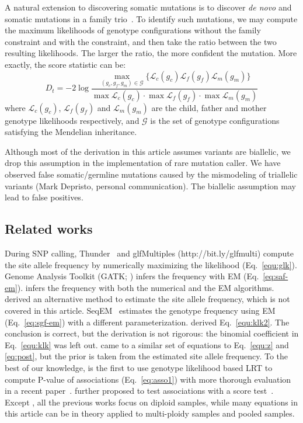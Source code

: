\documentclass{bioinfo}
\begin{document}
\begin{methods}
A natural extension to discovering somatic mutations is to discover {\it de
novo} and somatic mutations in a family trio~\citep{Conrad:2011kx}.  To
identify such mutations, we may compute the maximum likelihoods of genotype
configurations without the family constraint and with the constraint, and then
take the ratio between the two resulting likelihoods. The larger the ratio, the
more confident the mutation. More exactly, the score statistic can be:
\begin{equation}\label{eq:dt}
D_t=-2\log\frac
{\max_{(g_c,g_f,g_m)\in\mathcal{G}}\{\mathcal{L}_c(g_c)\mathcal{L}_f(g_f)\mathcal{L}_m(g_m)\}}
{\max\mathcal{L}_c(g_c)\cdot\max\mathcal{L}_f(g_f)\cdot\max\mathcal{L}_m(g_m)}
\end{equation}
where $\mathcal{L}_c(g_c)$, $\mathcal{L}_f(g_f)$ and $\mathcal{L}_m(g_m)$
are the child, father and mother genotype likelihoods respectively, and
$\mathcal{G}$ is the set of genotype configurations satisfying the Mendelian
inheritance.

Although most of the derivation in this article assumes variants are biallelic,
we drop this assumption in the implementation of rare mutation caller.  We have
observed false somatic/germline mutations caused by the mismodeling of
triallelic variants (Mark Depristo, personal communication). The biallelic
assumption may lead to false positives.

\subsection{Related works}
During SNP calling, Thunder~\citep{Li:2011fk} and glfMultiples
(http://bit.ly/glfmulti) compute the site allele frequency by numerically
maximizing the likelihood (Eq.~\ref{equ:glk}). Genome Analysis Toolkit (GATK;
\citealp{Depristo:2011vn}) infers the frequency with EM (Eq.~\ref{eq:saf-em}).
\citet{Kim:2011fk} infers the frequency with both the numerical and the EM
algorithms.  \citet{Li:2010ys} derived an alternative method to estimate the
site allele frequency, which is not covered in this article.
SeqEM~\citep{Martin:2010dz} estimates the genotype frequency using EM
(Eq.~\ref{eq:sgf-em}) with a different parameterization.  \citet{Le:2010uq}
derived Eq.~\eqref{equ:klk2}. The conclusion is correct, but the derivation is
not rigorous: the binomial coefficient in Eq.~\eqref{equ:klk} was left out.
\citet{Yi:2010zr} came to a similar set of equations to Eq.~\eqref{equ:z} and
\eqref{eq:post}, but the prior is taken from the estimated site allele
frequency.  To the best of our knowledge, \citet{Kim:2010ve} is the first to
use genotype likelihood based LRT to compute P-value of associations
(Eq.~\ref{eq:asso1}) with more thorough evaluation in a recent
paper~\citep{Kim:2011fk}. \citet{Nielsen:2011fk} further proposed to test
associations with a score test~\citep{Schaid:2002qf}.  Except
\citet{Kim:2010ve}, all the previous works focus on diploid samples, while many
equations in this article can be in theory applied to multi-ploidy samples and
pooled samples.


\end{methods}
\end{document}
